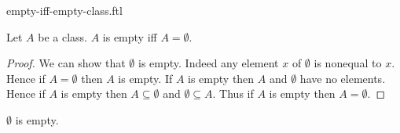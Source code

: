 \documentclass{stex}
\begin{document}
\begin{smodule}{empty-iff-empty-class.ftl}

  \begin{forthel}
    \begin{proposition}
      Let $A$ be a class.
      $A$ is empty iff $A = \emptyset$.
    \end{proposition}
    \begin{proof}
      We can show that $\emptyset$ is empty.
      Indeed any element $x$ of $\emptyset$ is nonequal to $x$.
      Hence if $A = \emptyset$ then $A$ is empty.
      If $A$ is empty then $A$ and $\emptyset$ have no elements.
      Hence if $A$ is empty then $A \subseteq \emptyset$ and
      $\emptyset \subseteq A$.
      Thus if $A$ is empty then $A = \emptyset$.
    \end{proof}
  \end{forthel}

  \begin{forthel}
    \begin{corollary}
      $\emptyset$ is empty.
    \end{corollary}
  \end{forthel}
\end{smodule}
\end{document}
